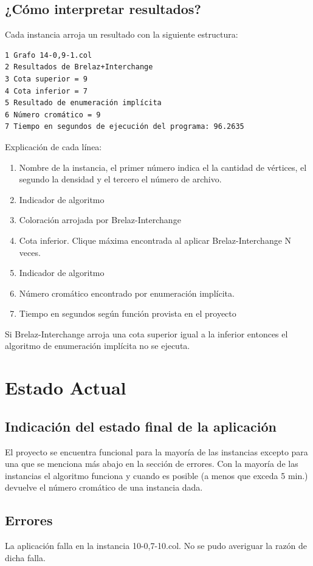 \documentclass[a4paper,10pt]{article}
\begin{document}
\subsection{¿Cómo interpretar resultados?}
Cada instancia arroja un resultado con la siguiente estructura:
\begin{verbatim}
1 Grafo 14-0,9-1.col
2 Resultados de Brelaz+Interchange
3 Cota superior = 9
4 Cota inferior = 7
5 Resultado de enumeración implícita 
6 Número cromático = 9 
7 Tiempo en segundos de ejecución del programa: 96.2635
\end{verbatim}
Explicación de cada línea:
\begin{enumerate}
 \item Nombre de la instancia, el primer número indica el la cantidad de vértices, el segundo la densidad y el tercero el número de archivo.
\item Indicador de algoritmo
\item Coloración arrojada por Brelaz-Interchange
\item Cota inferior. Clique máxima encontrada al aplicar Brelaz-Interchange N veces.
\item Indicador de algoritmo
\item Número cromático encontrado por enumeración implícita.
\item Tiempo en segundos según función provista en el proyecto
\end{enumerate}
Si Brelaz-Interchange arroja una cota superior igual a la inferior entonces el algoritmo de enumeración implícita 
no se ejecuta.

\section{Estado Actual}
\subsection{Indicación del estado final de la aplicación}
El proyecto se encuentra funcional para la mayoría de las instancias excepto para una que se menciona más abajo en la 
sección de errores. Con la mayoría de las instancias el algoritmo funciona y cuando es posible (a menos que exceda 5 min.) devuelve el número cromático de una instancia dada.
\subsection{Errores}
La aplicación falla en la instancia 10-0,7-10.col. No se pudo averiguar la razón de dicha falla.
\end{document}
